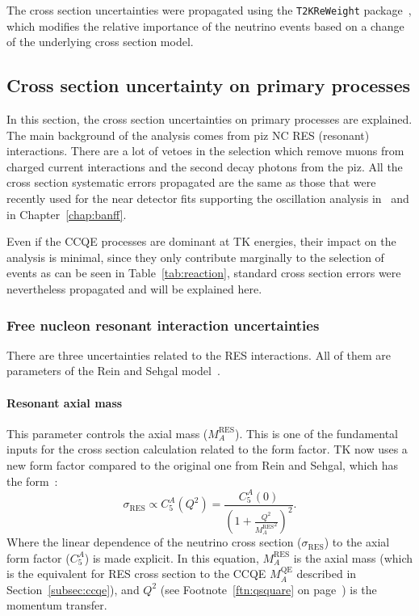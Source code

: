 
The cross section uncertainties were propagated using the
\texttt{\Gls{T2KReWeight}} package~\cite{t2kreweight}, which modifies
the relative importance of the neutrino events based on a change of the
underlying cross section model.

\subsection{Cross section uncertainty on primary processes}
\label{subsec:primaryprocessuncertainty}
In this section, the cross section uncertainties on primary processes
are explained. The main background of the analysis comes from \gls{piz}
\Gls{NC} \Gls{RES} (resonant) interactions. There are a lot of vetoes
in the selection which remove muons from charged current interactions
and the second decay photons from the \Gls{piz}. All the cross section
systematic errors propagated are the same as those that were recently
used for the near detector fits supporting the oscillation analysis
in~\cite{Abe:2017vif} and in Chapter~\ref{chap:banff}.

Even if the \Gls{CCQE} processes are dominant at \Gls{TK} energies,
their impact on the analysis is minimal, since they only contribute
marginally to the selection of events as can be seen in
Table~\ref{tab:reaction}, standard cross section errors were
nevertheless propagated and will be explained here.

\subsubsection{Free nucleon resonant interaction uncertainties}
\label{subsubsec:freeres}
There are three uncertainties related to the \Gls{RES}
interactions. All of them are parameters of the Rein and Sehgal
model~\cite{Rein1,Rein2}.

\paragraph{Resonant axial mass}
This parameter controls the axial mass ($M_A^{\text{RES}}$). This is
one of the fundamental inputs for the cross section calculation
related to the form factor. \Gls{TK} now uses a new form factor
compared to the original one from Rein and Sehgal, which has the
form~\cite{PhysRevD.77.053001}:
\begin{equation}
  \label{eq:ffres}
  \sigma_{\text{RES}} \propto  C^A_5(Q^2)=\frac{C^A_5(0)}{\left(1+\frac{Q^2}{\left.M_A^{\text{RES}}\right.^2}\right)^2}.
\end{equation}
Where the linear dependence of the neutrino cross section
($\sigma_{\text{RES}}$) to the axial form factor ($C^A_5$) is made
explicit. In this equation, $M_A^{\text{RES}}$ is the axial mass
(which is the equivalent for \Gls{RES} cross section to the \Gls{CCQE}
$M_A^{\text{QE}}$ described in Section~\ref{subsec:ccqe}), and $Q^2$
(see Footnote~\ref{ftn:qsquare} on page~\pageref{ftn:qsquare}) is the
momentum transfer.

